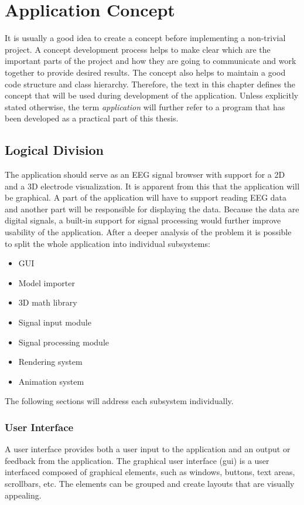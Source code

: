 \chapter{Application Concept} \label{concept}
It is usually a good idea to create a concept before implementing a non-trivial project. A concept development process helps to make clear which are the important parts of the project and how they are going to communicate and work together to provide desired results. The concept also helps to maintain a good code structure and class hierarchy. Therefore, the text in this chapter defines the concept that will be used during development of the application. Unless explicitly stated otherwise, the term \emph{application} will further refer to a program that has been developed as a practical part of this thesis. 

\section{Logical Division}
The application should serve as an EEG signal browser with support for a 2D and a 3D electrode visualization. It is apparent from this that the application will be graphical. A part of the application will have to support reading EEG data and another part will be responsible for displaying the data. Because the data are digital signals, a built-in support for signal processing would further improve usability of the application. After a deeper analysis of the problem it is possible to split the whole application into individual subsystems:
\begin{itemize}
	\item GUI
	\item Model importer
	\item 3D math library 
	\item Signal input module
	\item Signal processing module
	\item Rendering system
	\item Animation system
\end{itemize}

The following sections will address each subsystem individually.
\subsection{User Interface}
A user interface provides both a user input to the application and an output or feedback from the application. The graphical user interface (\gls{gui}) is a user interfaced composed of graphical elements, such as windows, buttons, text areas, scrollbars, etc. The elements can be grouped and create layouts that are visually appealing. 

